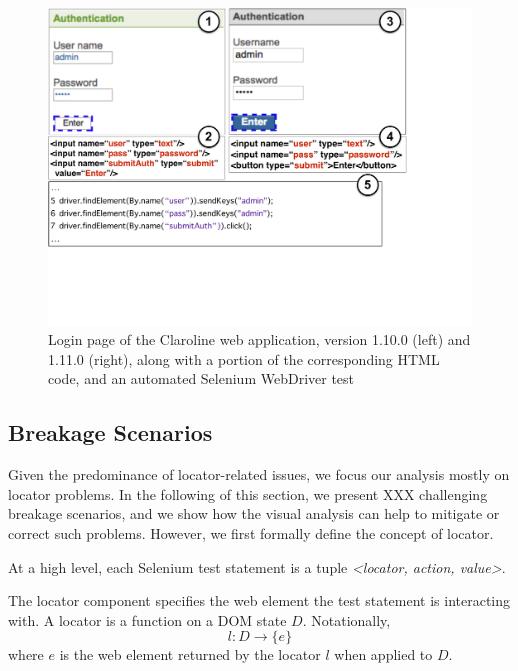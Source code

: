 \begin{figure}[t]
\centering
\includegraphics[trim={0cm 6.5cm 5.5cm 0cm},clip,scale=0.27]{images/claroline-together-2}
\caption{Login page of the Claroline web application, version 1.10.0 (left) and 1.11.0 (right), along with a portion of the corresponding HTML code, and an automated Selenium WebDriver test}
\label{claroline-together}
\end{figure}

\subsection{Breakage Scenarios}\label{sec:breakage-scenarios}

Given the predominance of locator-related issues, we focus our analysis mostly on locator problems. In the following of this section, we present XXX challenging breakage scenarios, and we show how the visual analysis can help to mitigate or correct such problems. However, we first formally define the concept of locator.

\begin{defn}
At a high level, each Selenium test statement is a tuple \textit{<locator, action, value>}.
\end{defn}

\begin{defn} 
The locator component specifies the web element the test statement is interacting with. A locator is a function on a DOM state $D$. Notationally, $$l: D \rightarrow \{e\}$$ where $e$ is the web element returned by the locator $l$ when applied to $D$. 
\end{defn}

